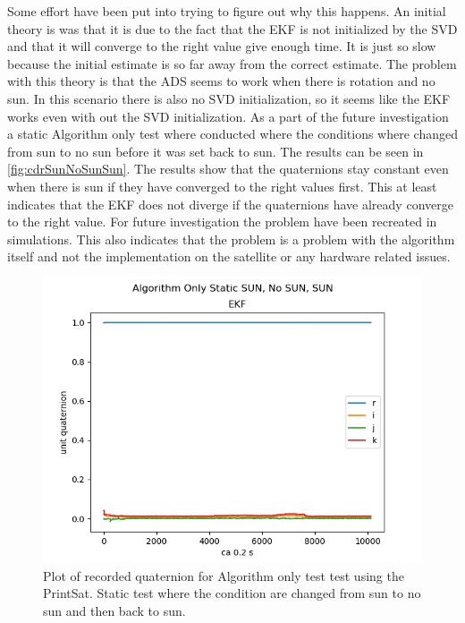 Some effort have been put into trying to figure out why this happens. An initial theory is was that it is due to the fact that the EKF is not initialized by the SVD and that it will converge to the right value give enough time. It is just so slow because the initial estimate is so far away from the correct estimate. The problem with this theory is that the ADS seems to work when there is rotation and no sun. In this scenario there is also no SVD initialization, so it seems like the EKF works even with out the SVD initialization. As a part of the future investigation a static Algorithm only test where conducted where the conditions where changed from sun to no sun before it was set back to sun. The results can be seen in \autoref{fig:cdrSunNoSunSun}. The results show that the quaternions stay constant even when there is sun if they have converged to the right values first. This at least indicates that the EKF does not diverge if the quaternions have already converge to the right value. For future investigation the problem have been recreated in simulations. This also indicates that the problem is a problem with the algorithm itself and not the implementation on the satellite or any hardware related issues. 

\begin{figure}[tbp]
	\centering
	\includegraphics[width=1\columnwidth]{./Pictures/cdrRun1StaticSunEclipsSun}
	\caption{Plot of recorded quaternion for Algorithm only test test using the PrintSat. Static test where the condition are changed from sun to no sun and then back to sun. }
	\label{fig:cdrSunNoSunSun}
\end{figure} 


